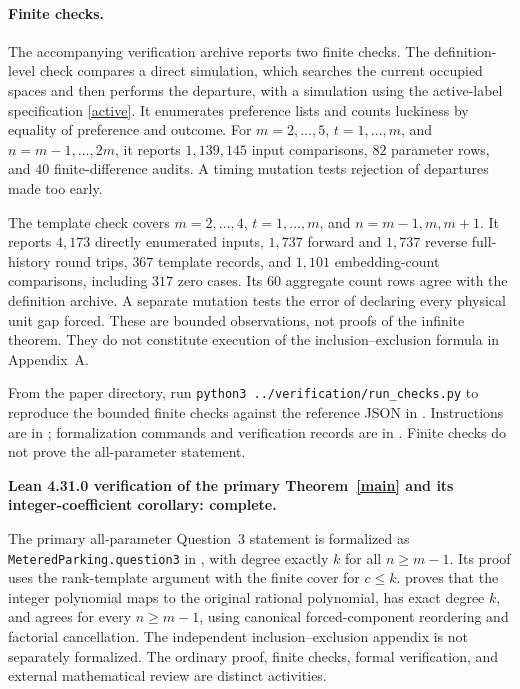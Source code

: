 \documentclass[11pt]{article}
\theoremstyle{definition}
\begin{document}
\paragraph{Finite checks.}
The accompanying verification archive reports two finite checks. The definition-level check compares a direct simulation, which searches the current occupied spaces and then performs the departure, with a simulation using the active-label specification \eqref{active}. It enumerates preference lists and counts luckiness by equality of preference and outcome. For $m=2,\ldots,5$, $t=1,\ldots,m$, and $n=m-1,\ldots,2m$, it reports $1{,}139{,}145$ input comparisons, $82$ parameter rows, and $40$ finite-difference audits. A timing mutation tests rejection of departures made too early.

The template check covers $m=2,\ldots,4$, $t=1,\ldots,m$, and $n=m-1,m,m+1$. It reports $4{,}173$ directly enumerated inputs, $1{,}737$ forward and $1{,}737$ reverse full-history round trips, $367$ template records, and $1{,}101$ embedding-count comparisons, including $317$ zero cases. Its $60$ aggregate count rows agree with the definition archive. A separate mutation tests the error of declaring every physical unit gap forced. These are bounded observations, not proofs of the infinite theorem. They do not constitute execution of the inclusion--exclusion formula in Appendix~A.

From the paper directory, run \texttt{python3 ../verification/run\_checks.py} to reproduce the bounded finite checks against the reference JSON in . Instructions are in ; formalization commands and verification records are in . Finite checks do not prove the all-parameter statement.

\medskip\noindent\textbf{Lean 4.31.0 verification of the primary Theorem~\ref{main} and its integer-coefficient corollary: complete.}

The primary all-parameter Question~3 statement is formalized as \texttt{MeteredParking.question3} in , with degree exactly $k$ for all $n\ge m-1$. Its proof uses the rank-template argument with the finite cover for $c\le k$.  proves that the integer polynomial maps to the original rational polynomial, has exact degree $k$, and agrees for every $n\ge m-1$, using canonical forced-component reordering and factorial cancellation. The independent inclusion--exclusion appendix is not separately formalized. The ordinary proof, finite checks, formal verification, and external mathematical review are distinct activities.
\end{document}
